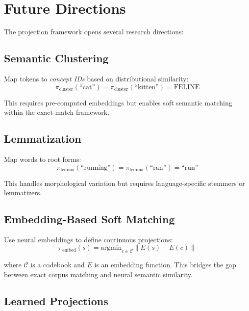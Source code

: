 \documentclass[11pt]{article}
\begin{document}
\section{Future Directions}

The projection framework opens several research directions:

\subsection{Semantic Clustering}

Map tokens to \emph{concept IDs} based on distributional similarity:
\begin{equation}
\pi_{\text{cluster}}(\text{``cat''}) = \pi_{\text{cluster}}(\text{``kitten''}) = \text{FELINE}
\end{equation}

This requires pre-computed embeddings but enables soft semantic matching within the exact-match framework.

\subsection{Lemmatization}

Map words to root forms:
\begin{equation}
\pi_{\text{lemma}}(\text{``running''}) = \pi_{\text{lemma}}(\text{``ran''}) = \text{``run''}
\end{equation}

This handles morphological variation but requires language-specific stemmers or lemmatizers.

\subsection{Embedding-Based Soft Matching}

Use neural embeddings to define continuous projections:
\begin{equation}
\pi_{\text{embed}}(s) = \text{argmin}_{c \in \mathcal{C}} \|E(s) - E(c)\|
\end{equation}

where $\mathcal{C}$ is a codebook and $E$ is an embedding function. This bridges the gap between exact corpus matching and neural semantic similarity.

\subsection{Learned Projections}
\end{document}
